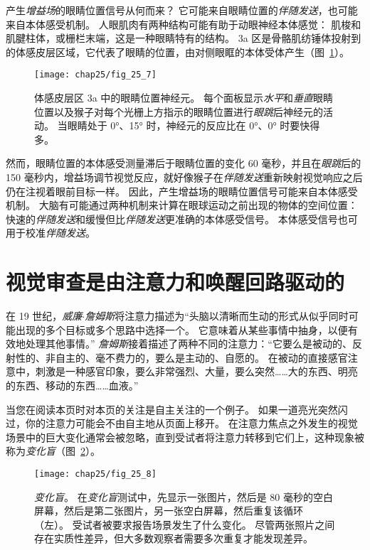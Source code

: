 产生\textit{增益场}的眼睛位置信号从何而来？
它可能来自眼睛位置的\textit{伴随发送}，也可能来自本体感受机制。
人眼肌肉有两种结构可能有助于动眼神经本体感觉：
肌梭和肌腱柱体，或栅栏末端，这是一种眼睛特有的结构。
3a 区是骨骼肌纺锤体投射到的体感皮层区域，它代表了眼睛的位置，由对侧眼眶的本体受体产生（图~\ref{fig:25_7}）。


\begin{figure}[htbp]
	\centering
	\texttt{[image: chap25/fig\_25\_7]}
	\caption{体感皮层区 3a 中的眼睛位置神经元。
		每个面板显示\textit{水平}和\textit{垂直}眼睛位置以及猴子对每个光栅上方指示的眼睛位置进行\textit{眼跳}后神经元的活动。
		当眼睛处于 0°、15° 时，神经元的反应比在 0°、0° 时要快得多。}
	\label{fig:25_7}
\end{figure}


然而，眼睛位置的本体感受测量滞后于眼睛位置的变化 60 毫秒，并且在\textit{眼跳}后的 150 毫秒内，增益场调节视觉反应，就好像猴子在\textit{伴随发送}重新映射视觉响应之后仍在注视着眼前目标一样。
因此，产生增益场的眼睛位置信号可能来自本体感受机制。
大脑有可能通过两种机制来计算在眼球运动之前出现的物体的空间位置：
快速的\textit{伴随发送}和缓慢但比\textit{伴随发送}更准确的本体感受信号。
本体感受信号也可用于校准\textit{伴随发送}。



\section{视觉审查是由注意力和唤醒回路驱动的}

在 19 世纪，\textit{威廉$\cdot$詹姆斯}将注意力描述为“头脑以清晰而生动的形式从似乎同时可能出现的多个目标或多个思路中选择一个。
它意味着从某些事情中抽身，以便有效地处理其他事情。” 
\textit{詹姆斯}接着描述了两种不同的注意力：“它要么是被动的、反射性的、非自主的、毫不费力的，要么是主动的、自愿的。
在被动的直接感官注意中，刺激是一种感官印象，要么非常强烈、大量，要么突然……大的东西、明亮的东西、移动的东西……血液。”


当您在阅读本页时对本页的关注是自主关注的一个例子。
如果一道亮光突然闪过，你的注意力可能会不由自主地从页面上移开。
在注意力焦点之外发生的视觉场景中的巨大变化通常会被忽略，直到受试者将注意力转移到它们上，这种现象被称为\textit{变化盲}（图~\ref{fig:25_8}）。


\begin{figure}[htbp]
	\centering
	\texttt{[image: chap25/fig\_25\_8]}
	\caption{\textit{变化盲}。
		在\textit{变化盲}测试中，先显示一张图片，然后是 80 毫秒的空白屏幕，然后是第二张图片，另一张空白屏幕，然后重复该循环（左）。
		受试者被要求报告场景发生了什么变化。
		尽管两张照片之间存在实质性差异，但大多数观察者需要多次重复才能发现差异。}
	\label{fig:25_8}
\end{figure}


